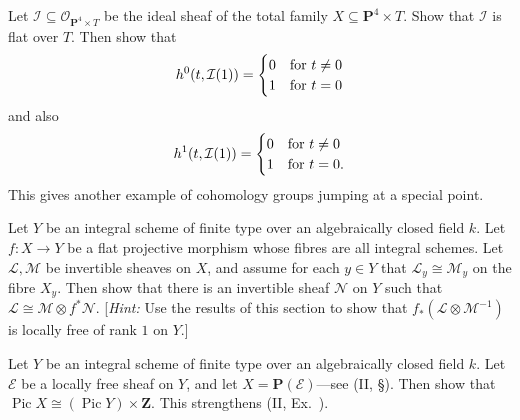 {Let $\mathcal I\subseteq\mathcal O_{\mathbf P^4\times T}$ be the ideal sheaf of the total family $X\subseteq\mathbf P^4\times T$. Show that $\mathcal I$ is flat over $T$. Then show that
\[
 h^0(t,\mathcal I(1))=
 \begin{cases}0&\text{for }t\ne0\\1&\text{for }t=0\end{cases}
\]
and also
\[
 h^1(t,\mathcal I(1))=
 \begin{cases}0&\text{for }t\ne0\\1&\text{for }t=0.\end{cases}
\]
This gives another example of cohomology groups jumping at a special point.

 Let $Y$ be an integral scheme of finite type over an algebraically closed field $k$. Let $f\colon X\to Y$ be a flat projective morphism whose fibres are all integral schemes. Let $\mathcal L,\mathcal M$ be invertible sheaves on $X$, and assume for each $y\in Y$ that $\mathcal L_y\cong\mathcal M_y$ on the fibre $X_y$. Then show that there is an invertible sheaf $\mathcal N$ on $Y$ such that $\mathcal L\cong\mathcal M\otimes f^*\mathcal N$. [\emph{Hint:} Use the results of this section to show that $f_*(\mathcal L\otimes\mathcal M^{-1})$ is locally free of rank $1$ on $Y$.]

 Let $Y$ be an integral scheme of finite type over an algebraically closed field $k$. Let $\mathcal E$ be a locally free sheaf on $Y$, and let $X=\mathbf P(\mathcal E)$---see (II, \S{}). Then show that $\operatorname{Pic}X\cong(\operatorname{Pic}Y)\times\mathbf Z$. This strengthens (II, Ex.~).
}
